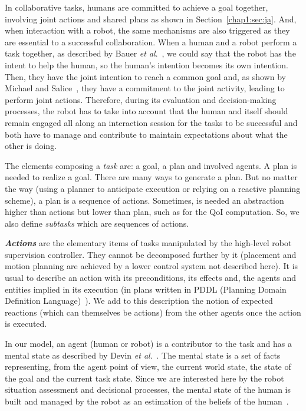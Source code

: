 \documentclass[a4paper,11pt,twoside]{StyleThese}
\begin{document}
In collaborative tasks, humans are committed to achieve a goal together, involving joint actions and shared plans as shown in Section~\ref{chap1:sec:ja}. And, when interaction with a robot, the same mechanisms are also triggered as they are essential to a successful collaboration. When a human and a robot perform a task together, as described by Bauer \textit{et al}.~\cite{bauer_2008_collab}, we could say that the robot has the intent to help the human, so the human's intention becomes its own intention. Then, they have the joint intention to reach a common goal and, as shown by Michael and Salice~\cite{michael_2017_commitment}, they have a commitment to the joint activity, leading to perform joint actions. Therefore, during its evaluation and decision-making processes, the robot has to take into account that the human and itself should remain engaged all along an interaction session for the tasks to be successful and both have to manage and contribute to maintain expectations about what the other is doing. 

The elements composing a \textit{task} are: a goal, a plan and involved agents. A plan is needed to realize a goal. There are many ways to generate a plan. But no matter the way (using a planner to anticipate execution or relying on a reactive planning scheme), a plan is a sequence of actions. Sometimes, is needed an abstraction higher than actions but lower than plan, such as for the QoI computation. So, we also define \emph{subtasks} which are sequences of actions. 

\textbf{\textit{Actions}} are the elementary items of tasks manipulated by the high-level robot supervision controller. They cannot be decomposed further by it (\eg placement and motion planning are achieved by a lower control system not described here). It is usual to describe an action with its preconditions, its effects and, the agents and entities implied in its execution (\eg in plans written in PDDL (Planning Domain Definition Language)~\cite{ghallab_98_pddl}). We add to this description the notion of expected reactions (which can themselves be actions) from the other agents once the action is executed.

In our model, an agent (human or robot) is a contributor to the task and has a mental state as described by Devin \textit{et al}.~\cite{devin_2016_implemented}. The mental state is a set of facts representing, from the agent point of view, the current world state, the state of the goal and the current task state. Since we are interested here by the robot situation assessment and decisional processes, the mental state of the human is built and managed by the robot as an estimation of the beliefs of the human~\cite{milliez_2014_framework, hiatt_2017_modeling,tabrez_2020}.
\end{document}
